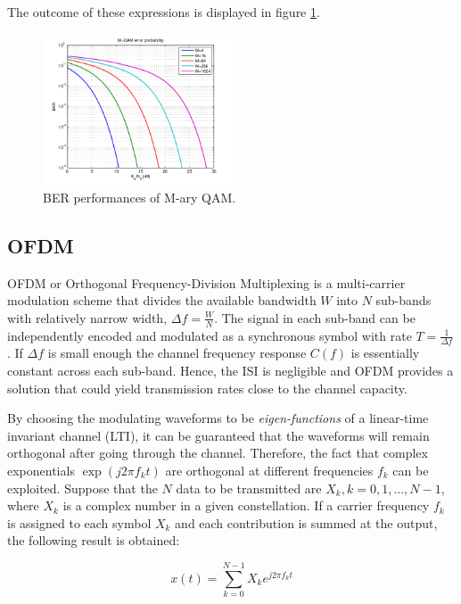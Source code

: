 \documentclass[12pt,a4paper,openright]{report}
\begin{document}
The outcome of these expressions is displayed in figure \ref{fig:mqamber}.

 \begin{figure}[H]
  \centering
    \includegraphics[width=0.5\textwidth]{MQAMber.png}
    \caption[BER performances of M-ary QAM]{BER performances of M-ary QAM.}
    \label{fig:mqamber}
\end{figure}




\subsection{OFDM}
\label{sec:OFDM}
OFDM or Orthogonal Frequency-Division Multiplexing is a multi-carrier modulation scheme that divides the available bandwidth $W$ into $N$ sub-bands with relatively narrow width, $\Delta f = \frac{W}{N}$. The signal in each sub-band can be independently encoded and modulated as a synchronous symbol with rate $T = \frac{1}{\Delta f}$. If $\Delta f$ is small enough the channel frequency response $C(f)$ is essentially constant across each sub-band. Hence, the ISI is negligible and OFDM provides a solution that could yield transmission rates close to the channel capacity. 

By choosing the modulating waveforms to be \emph{eigen-functions} of a linear-time invariant channel (LTI), it can be guaranteed that the waveforms will remain orthogonal after going through the channel. Therefore, the fact that complex exponentials $\exp{(j2\pi f_k t)}$ are orthogonal at different frequencies $f_k$  can be exploited.  Suppose that the $N$ data to be transmitted are $X_k, k=0,1,...,N-1$, where $X_k$ is a complex number in a given constellation. If a carrier frequency $f_k$ is assigned to each symbol $X_k$ and each contribution is summed at the output, the following result is obtained:

\begin{equation}
x(t) = \sum\limits_{k = 0}^{N - 1} {{X_k}{e^{j2\pi {f_k}t}}}
\end{equation}
\end{document}
